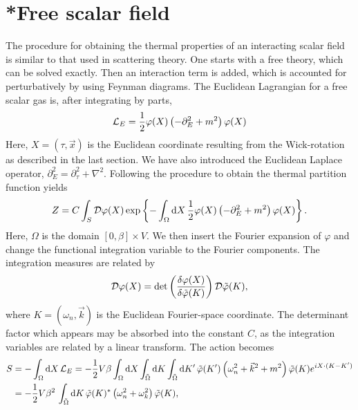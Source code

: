 \section{*Free scalar field}
\label{section:free scalar field}

The procedure for obtaining the thermal properties of an interacting scalar field is similar to that used in scattering theory.
One starts with a free theory, which can be solved exactly.
Then an interaction term is added, which is accounted for perturbatively by using Feynman diagrams.
The Euclidean Lagrangian for a free scalar gas is, after integrating by parts,
%
\begin{equation}
    \mathcal{L}_E = \frac{1}{2} \varphi(X) \left( -\partial_E^2 + m^2 \right) \varphi(X)
\end{equation}
%
Here, $X = (\tau, \vec x)$ is the Euclidean coordinate resulting from the Wick-rotation as described in the last section.
We have also introduced the Euclidean Laplace operator, $\partial_E^2 = \partial_\tau^2 + \nabla^2$.
Following the procedure to obtain the thermal partition function yields
%
\begin{equation}
    Z = C \int_S \mathcal D \varphi(X) \,
    \text{exp} \left\{ 
        - \int_\Omega \text{d} X\, \frac{1}{2} 
        \varphi(X) \left( -\partial_E^2 + m^2 \right) \varphi(X)
     \right\}.
\end{equation}
%
Here, $\Omega$ is the domain $[0, \beta] \times V$.
We then insert the Fourier expansion of $\varphi$ and change the functional integration variable to the Fourier components.
The integration measures are related by
\begin{equation*}
    \mathcal D \varphi(X) = \det\left(\frac{\delta \varphi(X)}{\delta \tilde \varphi(K)}\right) \mathcal D\tilde \varphi(K),
\end{equation*}
where $K = (\omega_n, \vec k)$ is the Euclidean Fourier-space coordinate.
The determinant factor which appears may be absorbed into the constant $C$, as the integration variables are related by a linear transform.
The action becomes
%
\begin{align*}
    S & = - \int_\Omega \text{d} X\, \mathcal{L}_E 
    = - \frac{1}{2} V \beta \int_\Omega \text{d} X \int_{\tilde \Omega} \text{d} K \int_{\tilde \Omega} \text{d} K' \,
    \tilde \varphi(K') 
    \left(
        \omega_n^2 + \vec k^2 + m^2
    \right)
    \tilde \varphi(K)
    e^{iX\cdot(K - K')} \\
    & = - \frac{1}{2} V \beta^2 \, \int_{\tilde \Omega} \text{d} K \,
    \tilde \varphi(K)^*
    \left(
        \omega_n^2 + \omega_k^2
    \right)
    \tilde \varphi(K),
\end{align*}
